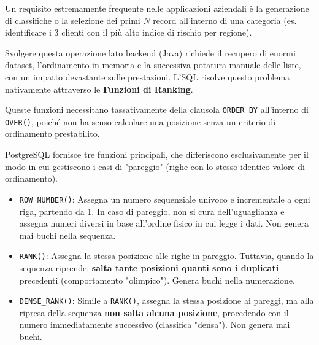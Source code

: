 Un requisito estremamente frequente nelle applicazioni aziendali è la generazione di classifiche o la selezione dei primi $N$ record all'interno di una categoria (es. identificare i 3 clienti con il più alto indice di rischio per regione). 

Svolgere questa operazione lato backend (Java) richiede il recupero di enormi dataset, l'ordinamento in memoria e la successiva potatura manuale delle liste, con un impatto devastante sulle prestazioni. L'SQL risolve questo problema nativamente attraverso le \textbf{Funzioni di Ranking}. 

Queste funzioni necessitano tassativamente della clausola \texttt{ORDER BY} all'interno di \texttt{OVER()}, poiché non ha senso calcolare una posizione senza un criterio di ordinamento prestabilito.

PostgreSQL fornisce tre funzioni principali, che differiscono esclusivamente per il modo in cui gestiscono i casi di "pareggio" (righe con lo stesso identico valore di ordinamento).



\begin{itemize}
    \item \texttt{ROW\_NUMBER()}: Assegna un numero sequenziale univoco e incrementale a ogni riga, partendo da 1. In caso di pareggio, non si cura dell'uguaglianza e assegna numeri diversi in base all'ordine fisico in cui legge i dati. Non genera mai buchi nella sequenza.
    \item \texttt{RANK()}: Assegna la stessa posizione alle righe in pareggio. Tuttavia, quando la sequenza riprende, \textbf{salta tante posizioni quanti sono i duplicati} precedenti (comportamento "olimpico"). Genera buchi nella numerazione.
    \item \texttt{DENSE\_RANK()}: Simile a \texttt{RANK()}, assegna la stessa posizione ai pareggi, ma alla ripresa della sequenza \textbf{non salta alcuna posizione}, procedendo con il numero immediatamente successivo (classifica "densa"). Non genera mai buchi.
\end{itemize}

